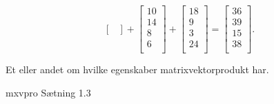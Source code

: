 \begin{eks}
$$\begin{bmatrix}
\end{bmatrix}
+
\begin{bmatrix}
10\\
14\\
8\\
6\\
\end{bmatrix}
+
\begin{bmatrix}
18\\
9\\
3\\
24\\
\end{bmatrix}
=
\begin{bmatrix}
36\\
39\\
15\\
38\\
\end{bmatrix}.
$$
\end{eks}
Et eller andet om hvilke egenskaber matrixvektorprodukt har.

\begin{thm}{}{mxvpro}
Sætning 1.3
\end{thm}
